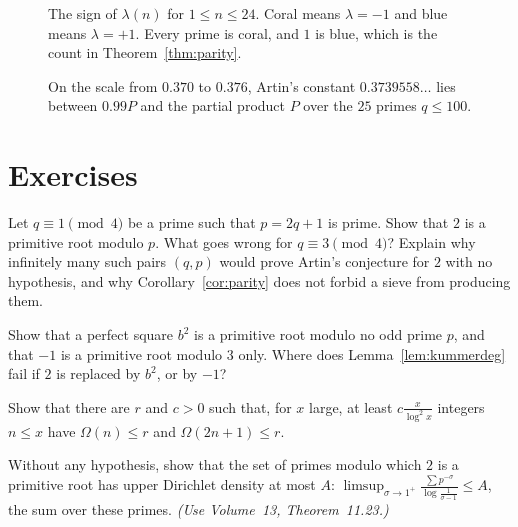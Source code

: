 \begin{figure}[ht]
\centering
{}
\caption{The sign of $\lambda(n)$ for $1\le n\le24$. Coral means $\lambda=-1$ and blue means $\lambda=+1$. Every prime is coral, and $1$ is blue, which is the count in Theorem~\ref{thm:parity}.}
\label{fig:v14-extra-03-a}
\end{figure}

\begin{figure}[ht]
\centering
{}
\caption{On the scale from $0.370$ to $0.376$, Artin's constant $0.3739558\ldots$ lies between $0.99P$ and the partial product $P$ over the $25$ primes $q\le100$.}
\label{fig:v14-extra-03-b}
\end{figure}

\section{Exercises}

\begin{exercise}[$\star$]\label{ex:sg}
Let $q\equiv1\pmod4$ be a prime such that $p=2q+1$ is prime. Show that $2$ is a primitive root modulo $p$. What goes wrong for $q\equiv3\pmod4$? Explain why infinitely many such pairs $(q,p)$ would prove Artin's conjecture for $2$ with no hypothesis, and why Corollary~\ref{cor:parity} does not forbid a sieve from producing them.
\end{exercise}

\begin{exercise}[$\star$]\label{ex:squares}
Show that a perfect square $b^2$ is a primitive root modulo no odd prime $p$, and that $-1$ is a primitive root modulo $3$ only. Where does Lemma~\ref{lem:kummerdeg} fail if $2$ is replaced by $b^2$, or by $-1$?
\end{exercise}

\begin{exercise}[$\star\star$]\label{ex:almostsg}
Show that there are $r$ and $c>0$ such that, for $x$ large, at least $c\frac x{\log^2x}$ integers $n\le x$ have $\Omega(n)\le r$ and $\Omega(2n+1)\le r$.
\end{exercise}

\begin{exercise}[$\star\star$]\label{ex:artinupper}
Without any hypothesis, show that the set of primes modulo which $2$ is a primitive root has upper Dirichlet density at most $A$: $\limsup_{\sigma\to1^+}\frac{\sum p^{-\sigma}}{\log\frac1{\sigma-1}}\le A$, the sum over these primes. \emph{(Use Volume~13, Theorem~11.23.)}
\end{exercise}


